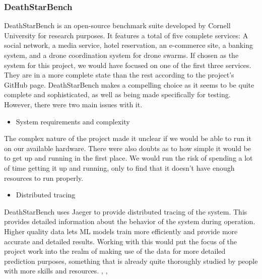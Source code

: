 \subsubsection{DeathStarBench}
DeathStarBench is an open-source benchmark suite developed by Cornell University for research purposes. 
It features a total of five complete services: A social network, a media service, hotel reservation, an e-commerce site, a banking system, and a drone coordination system for drone swarms. If chosen as the system for this project, we would have focused on one of the first three services. They are in a more complete state than the rest according to the project's GitHub page. 
DeathStarBench makes a compelling choice as it seems to be quite complete and sophisticated, as well as being made specifically for testing. \cite*{Gan2019} \\
However, there were two main issues with it.
\begin{itemize}
    \item System requirements and complexity
\end{itemize}
The complex nature of the project made it unclear if we would be able to run it on our available hardware. There were also doubts as to how simple it would be to get up and running in the first place. We would run the risk of spending a lot of time getting it up and running, only to find that it doesn't have enough resources to run properly.
\begin{itemize}
    \item Distributed tracing
\end{itemize}
DeathStarBench uses Jaeger to provide distributed tracing of the system. This provides detailed information about the behavior of the system during operation. Higher quality data lets ML models train more efficiently and provide more accurate and detailed results. 
Working with this would put the focus of the project work into the realm of making use of the data for more detailed prediction purposes, something that is already quite thoroughly studied by people with more skills and resources. \cite*{Bogatinovski}, \cite*{Nedelkoski2019}, \cite*{Zhou2021a}

